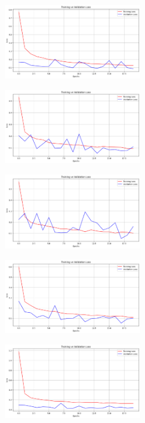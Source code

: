 \begin{multicols}{2}
\vspace{0.8cm}

\includegraphics[width=0.45\textwidth]{Assets/validation_loss/MobileNetV3Large.png}

\vspace{0.8cm}

\includegraphics[width=0.45\textwidth]{Assets/validation_loss/ResNet50.png}

\vspace{0.8cm}

\includegraphics[width=0.45\textwidth]{Assets/validation_loss/RESNET101.png}

\vspace{0.8cm}

\includegraphics[width=0.45\textwidth]{Assets/validation_loss/RESNET152.png}

\vspace{0.8cm}

\includegraphics[width=0.45\textwidth]{Assets/validation_loss/vgg16.png}

\vspace{0.8cm}

\end{multicols}


